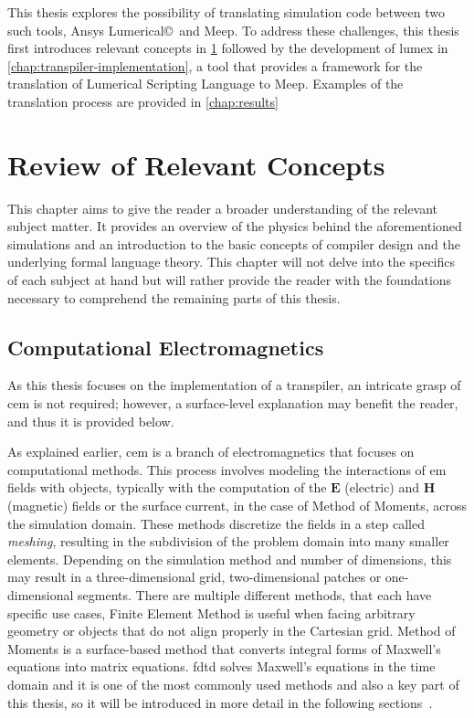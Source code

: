 This thesis explores the possibility of translating simulation code between two such tools, Ansys Lumerical\copyright\ and Meep. To address these challenges, this thesis first introduces relevant concepts in \cref{chap:review} followed by the development of \gls{lumex} in \cref{chap:transpiler-implementation}, a tool that provides a framework for the translation of Lumerical Scripting Language to Meep. Examples of the translation process are provided in \cref{chap:results}



  
  

\chapter{Review of Relevant Concepts}\label{chap:review}
This chapter aims to give the reader a broader understanding of the relevant subject matter. It provides an overview of the physics behind the aforementioned simulations and an introduction to the basic concepts of compiler design and the underlying formal language theory. This chapter will not delve into the specifics of each subject at hand but will rather provide the reader with the foundations necessary to comprehend the remaining parts of this thesis.

\section{Computational Electromagnetics}\label{sec:cem}
As this thesis focuses on the implementation of a transpiler, an intricate grasp of \gls{cem} is not required; however, a surface-level explanation may benefit the reader, and thus it is provided below.

As explained earlier, \gls{cem} is a branch of electromagnetics that focuses on computational methods. This process involves modeling the interactions of \gls{em} fields with objects, typically with the computation of the $\mathbf{E}$ (electric) and $\mathbf{H}$ (magnetic) fields or the surface current, in the case of Method of Moments, across the simulation domain. These methods discretize the fields in a step called \emph{meshing}, resulting in the subdivision of the problem domain into many smaller elements. Depending on the simulation method and number of dimensions, this may result in a three-dimensional grid, two-dimensional patches or one-dimensional segments. There are multiple different methods, that each have specific use cases, Finite Element Method is useful when facing arbitrary geometry or objects that do not align properly in the Cartesian grid. Method of Moments is a surface-based method that converts integral forms of Maxwell's equations into matrix equations. \gls{fdtd} solves Maxwell's equations in the time domain and it is one of the most commonly used methods and also a key part of this thesis, so it will be introduced in more detail in the following sections~\cite{davidson_2010}.


